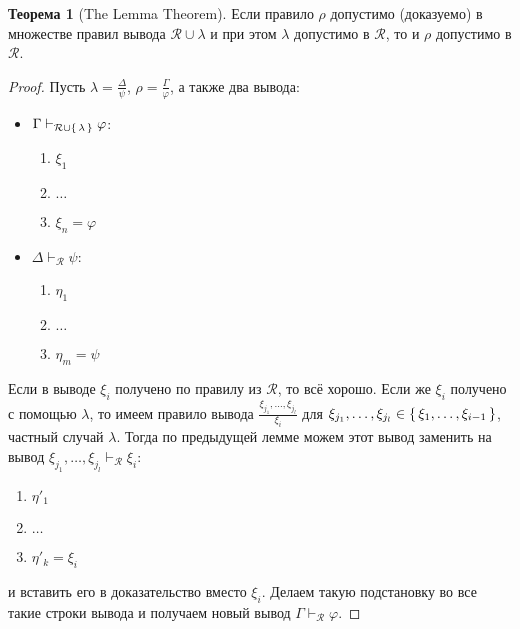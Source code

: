 \documentclass[12pt]{article}
\let\un\cup
\let\ds\displaystyle
\theoremstyle{definition}
\newtheorem{theorem}{Теорема}[section]
\theoremstyle{statement}
\theoremstyle{theorem}
\begin{document}
\begin{theorem}[The Lemma Theorem]
  Если правило $\rho$ допустимо (доказуемо) в множестве правил вывода
  $\mathcal{R} \un \lambda$ и при этом $\lambda$ допустимо в
  $\mathcal{R}$, то и $\rho$ допустимо в $\mathcal{R}$.
  \begin{proof}
    Пусть $\ds\lambda = \frac{\Delta}{\psi}$, $\ds\rho =
    \frac{\Gamma}{\varphi}$, а также два вывода:
    \begin{itemize}
      \item $\Gamma \vdash_{\mathcal{R} \un \set{\lambda}} \varphi$:
        \begin{enumerate}
          \item $\xi_1$

          \item $\dots$

          \item $\xi_n = \varphi$
        \end{enumerate}

      \item $\Delta \vdash_{\mathcal{R}} \psi$:
        \begin{enumerate}
          \item $\eta_1$

          \item $\dots$

          \item $\eta_m = \psi$
        \end{enumerate}
    \end{itemize}
    Если в выводе $\xi_i$ получено по правилу из $\mathcal{R}$, то
    всё хорошо. Если же $\xi_i$ получено с помощью $\lambda$, то
    имеем правило вывода $\ds\frac{\xi_{j_1}, \dots,
    \xi_{j_l}}{\xi_i}$ для $\xi_{j_1}, \dots, \xi_{j_l} \in
    \set{\xi_1, \dots, \xi_{i-1}}$, частный случай $\lambda$. Тогда
    по предыдущей лемме можем этот вывод заменить на вывод
    $\xi_{j_1}, \dots, \xi_{j_l} \vdash_{\mathcal{R}} \xi_i$:
    \begin{enumerate}
      \item $\eta'_1$

      \item $\dots$

      \item $\eta'_k = \xi_i$
    \end{enumerate}
    и вставить его в доказательство вместо $\xi_i$. Делаем такую
    подстановку во все такие строки вывода и получаем новый вывод
    $\Gamma \vdash_{\mathcal{R}} \varphi$.
  \end{proof}
\end{theorem}
\end{document}
